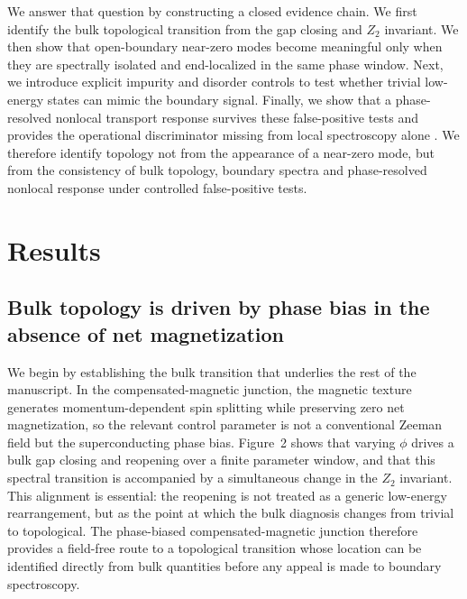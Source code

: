 \documentclass[11pt]{article}
\begin{document}
We answer that question by constructing a closed evidence chain. We first identify the bulk topological transition from the gap closing and $Z_2$ invariant. We then show that open-boundary near-zero modes become meaningful only when they are spectrally isolated and end-localized in the same phase window. Next, we introduce explicit impurity and disorder controls to test whether trivial low-energy states can mimic the boundary signal. Finally, we show that a phase-resolved nonlocal transport response survives these false-positive tests and provides the operational discriminator missing from local spectroscopy alone \cite{nonlocal-majorana-diagnostic-theory,experimental-nonlocal-majorana-probe}. We therefore identify topology not from the appearance of a near-zero mode, but from the consistency of bulk topology, boundary spectra and phase-resolved nonlocal response under controlled false-positive tests.


\section{Results}

\subsection{Bulk topology is driven by phase bias in the absence of net magnetization}

We begin by establishing the bulk transition that underlies the rest of the manuscript. In the compensated-magnetic junction, the magnetic texture generates momentum-dependent spin splitting while preserving zero net magnetization, so the relevant control parameter is not a conventional Zeeman field but the superconducting phase bias. Figure~2 shows that varying $\phi$ drives a bulk gap closing and reopening over a finite parameter window, and that this spectral transition is accompanied by a simultaneous change in the $Z_2$ invariant. This alignment is essential: the reopening is not treated as a generic low-energy rearrangement, but as the point at which the bulk diagnosis changes from trivial to topological. The phase-biased compensated-magnetic junction therefore provides a field-free route to a topological transition whose location can be identified directly from bulk quantities before any appeal is made to boundary spectroscopy.
\end{document}
